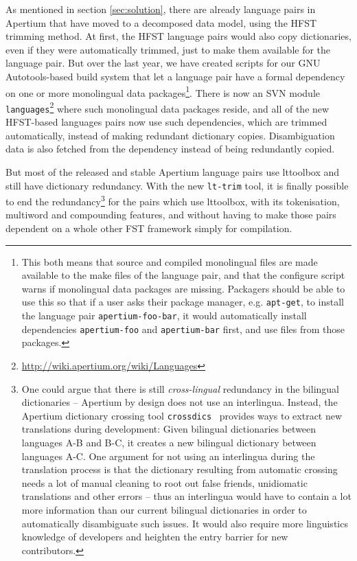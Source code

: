 \documentclass[10pt, a4paper]{article}
\newcommand{\tool}[1]{\texttt{#1}}
\begin{document}
As mentioned in section \ref{sec:solution}, there are already language
pairs in Apertium that have moved to a decomposed data model, using
the HFST trimming method. At first, the HFST language
pairs would also copy dictionaries, even if they were automatically
trimmed, just to make them available for the language pair.  But over
the last year, we have created scripts for our GNU Autotools-based
build system that let a language pair have a formal dependency on one
or more monolingual data packages\footnote{This both means that source
    and compiled monolingual files are made available to the make
    files of the language pair, and that the configure script warns if
    monolingual data packages are missing. Packagers should be able to
    use this so 
    that if a user asks their package manager, e.g. \tool{apt-get}, to
    install the language pair \tool{apertium-foo-bar}, it would
automatically install dependencies \tool{apertium-foo} and
\tool{apertium-bar} first, and use files from those packages.}.  There
is now an SVN module
\texttt{languages}\footnote{\url{http://wiki.apertium.org/wiki/Languages}}
where such monolingual data packages reside, and all of the new
HFST-based languages pairs now use such dependencies, which are
trimmed automatically, instead of making redundant dictionary copies.
Disambiguation data is also fetched from the dependency instead of
being redundantly copied.

But most of the released and stable Apertium language pairs use
lttoolbox and still have dictionary redundancy. With the new
\tool{lt-trim} tool, it is finally possible to end the
redundancy\footnote{One could argue that there is still
  \emph{cross-lingual} redundancy in the bilingual dictionaries --
  Apertium by design does not use an interlingua. Instead, the
  Apertium dictionary crossing tool
  \tool{crossdics}~\cite{toral2011crossdics-it-ca} provides ways to
  extract new translations during development: Given bilingual
  dictionaries between languages A-B and B-C, it creates a new
  bilingual dictionary between languages A-C. One argument for not
  using an interlingua during the translation process is that the
  dictionary resulting from automatic crossing needs a lot of manual
  cleaning to root out false friends, unidiomatic translations and
  other errors -- thus an interlingua would have to contain a lot more
  information than our current bilingual dictionaries in order to
  automatically disambiguate such issues. It would also require more
  linguistics knowledge of developers and heighten the entry barrier
  for new contributors.} for the pairs which use lttoolbox, with its
tokenisation, multiword and compounding features, and without having
to make those pairs dependent on a whole other FST framework simply
for compilation.
\end{document}
